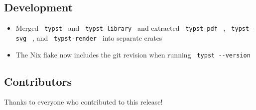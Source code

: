 \subsection{Development}\label{development}

\begin{itemize}
\tightlist
\item
  Merged \texttt{\ typst\ } and \texttt{\ typst-library\ } and extracted
  \texttt{\ typst-pdf\ } , \texttt{\ typst-svg\ } , and
  \texttt{\ typst-render\ } into separate crates
\item
  The Nix flake now includes the git revision when running
  \texttt{\ typst\ -\/-version\ }
\end{itemize}

\subsection{Contributors}\label{contributors}

Thanks to everyone who contributed to this release!

